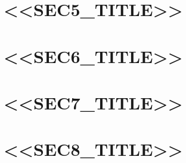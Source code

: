 \documentclass[11pt,a4paper]{article}
\begin{document}
\section{<<SEC5_TITLE>>}
\label{sec:innovation}



\section{<<SEC6_TITLE>>}
\label{sec:feasibility}



\section{<<SEC7_TITLE>>}
\label{sec:timeline}



\section{<<SEC8_TITLE>>}
\label{sec:expected-results}



\newpage
\printbibliography[title=<<BIB_TITLE>>]
\end{document}
